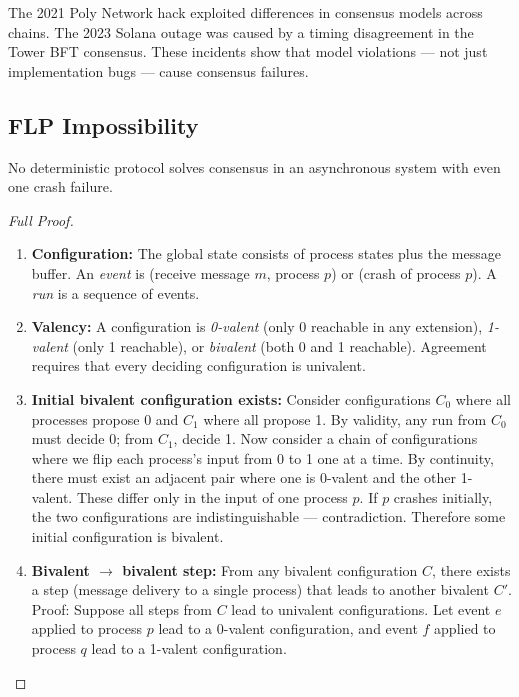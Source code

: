 The 2021 Poly Network hack exploited differences in consensus models across chains. The 2023 Solana outage was caused by a timing disagreement in the Tower BFT consensus. These incidents show that model violations — not just implementation bugs — cause consensus failures.

\subsection{FLP Impossibility}
\label{sec:consensus:flp}

\begin{theorem}[FLP 1985]
No deterministic protocol solves consensus in an asynchronous system with even one crash failure.
\end{theorem}

\begin{proof}[Full Proof]
\begin{enumerate}
\item \textbf{Configuration:} The global state consists of process states plus the message buffer. An \emph{event} is (receive message $m$, process $p$) or (crash of process $p$). A \emph{run} is a sequence of events.

\item \textbf{Valency:} A configuration is \emph{0-valent} (only 0 reachable in any extension), \emph{1-valent} (only 1 reachable), or \emph{bivalent} (both 0 and 1 reachable). Agreement requires that every deciding configuration is univalent.

\item \textbf{Initial bivalent configuration exists:} Consider configurations $C_0$ where all processes propose 0 and $C_1$ where all propose 1. By validity, any run from $C_0$ must decide 0; from $C_1$, decide 1. Now consider a chain of configurations where we flip each process's input from 0 to 1 one at a time. By continuity, there must exist an adjacent pair where one is 0-valent and the other 1-valent. These differ only in the input of one process $p$. If $p$ crashes initially, the two configurations are indistinguishable — contradiction. Therefore some initial configuration is bivalent.

\item \textbf{Bivalent $\to$ bivalent step:} From any bivalent configuration $C$, there exists a step (message delivery to a single process) that leads to another bivalent $C'$. Proof: Suppose all steps from $C$ lead to univalent configurations. Let event $e$ applied to process $p$ lead to a 0-valent configuration, and event $f$ applied to process $q$ lead to a 1-valent configuration.


\end{enumerate}
\end{proof}
